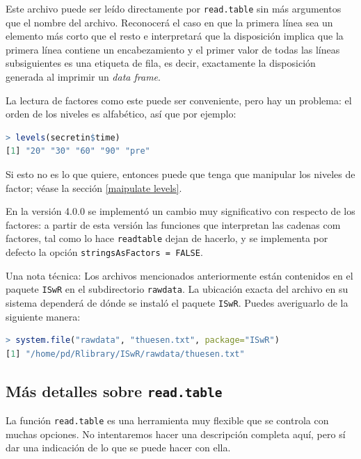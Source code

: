 Este archivo puede ser leído directamente por \texttt{read.table} sin más argumentos que
el nombre del archivo. Reconocerá el caso en que la primera línea sea un
elemento más corto que el resto e interpretará que la disposición implica que la
primera línea contiene un encabezamiento y el primer valor de todas las líneas
subsiguientes es una etiqueta de fila, es decir, exactamente la disposición
generada al imprimir un \textit{data frame}.

La lectura de factores como este puede ser conveniente, pero hay un
problema: el orden de los niveles es alfabético, así que por ejemplo:

\begin{lstlisting}[language=R]
> levels(secretin$time)
[1] "20" "30" "60" "90" "pre"
\end{lstlisting}

Si esto no es lo que quiere, entonces puede que tenga que manipular los niveles
de factor; véase la sección \ref{maipulate levels}.

\newpage
\begin{tradnote}En la versión 4.0.0 se implementó un cambio muy significativo
con respecto de los factores: a partir de esta versión las funciones que
interpretan las cadenas com factores, tal como lo hace \texttt{readtable} dejan
de hacerlo, y se implementa por defecto la opción \texttt{stringsAsFactors =
FALSE}.
\end{tradnote}

Una nota técnica: Los archivos mencionados anteriormente están contenidos en el
paquete \texttt{ISwR} en el subdirectorio \texttt{rawdata}. La ubicación exacta
del archivo en su sistema dependerá de dónde se instaló el paquete
\texttt{ISwR}. Puedes averiguarlo de la siguiente manera:

\begin{lstlisting}[language=R]
> system.file("rawdata", "thuesen.txt", package="ISwR")
[1] "/home/pd/Rlibrary/ISwR/rawdata/thuesen.txt"
\end{lstlisting}

\subsection{Más detalles sobre \texttt{read.table}}

La función \texttt{read.table} es una herramienta muy flexible que se controla
con muchas opciones. No intentaremos hacer una descripción completa aquí, pero
sí dar una indicación de lo que se puede hacer con ella.

